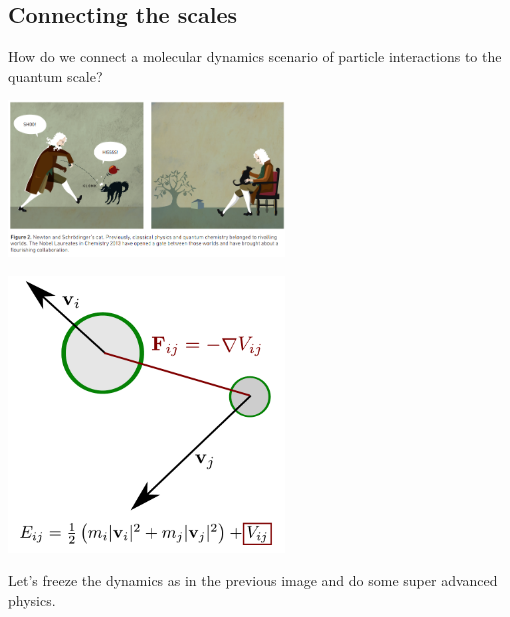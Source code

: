 \documentclass[
paper=128mm:96mm, %
fontsize=11pt, %
pagesize, %
parskip=half-, %
]{scrartcl} %
\theoremstyle{mythmstyle} %
\begin{document}
\clearpage


\subsection{Connecting the scales}

How do we connect a molecular dynamics scenario of particle interactions to the quantum scale?

\clearpage


\begin{center}
\includegraphics[width=0.55\textwidth]{newtonSchrodinger}
\end{center}

\clearpage



\begin{center}
\includegraphics[width=0.55\textwidth]{moleculesColliding.pdf}
\end{center}

\clearpage


Let's freeze the dynamics as in the previous image and do some super advanced physics.
\clearpage
\end{document}

